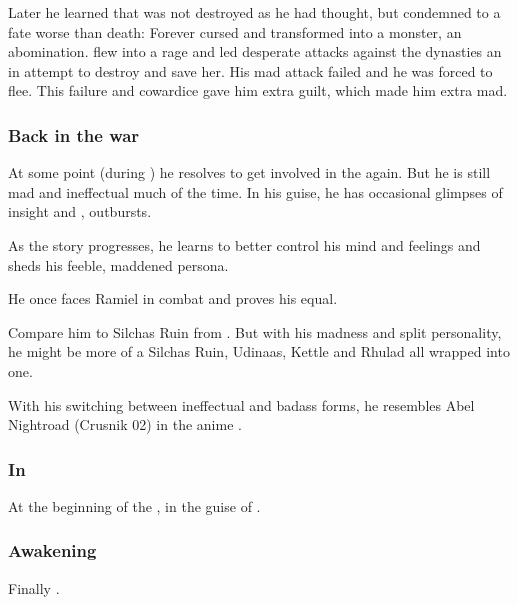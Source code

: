 Later he learned that  was not destroyed as he had thought, but condemned to a fate worse than death:
Forever cursed and transformed into a monster, an abomination. 
\Sithiyacaan flew into a rage and led desperate attacks against the dynasties an in attempt to destroy \iquin and save her. 
His mad attack failed and he was forced to flee. 
This failure and cowardice gave him extra guilt, which made him extra mad. 





\subsubsection{Back in the war}
At some point (during \SentinelsofMithEmph) he resolves to get involved in the \secretwar{} again. 
But he is still mad and ineffectual much of the time. 
In his \human{} guise, he has occasional glimpses of insight and ,  outbursts.

As the story progresses, he learns to better control his mind and feelings and sheds his feeble, maddened persona.

He once faces Ramiel in combat and proves his equal.

Compare him to Silchas Ruin from \cite{StevenEriksonIanCameronEsslemont:MalazanBookoftheFallen}. 
But with his madness and split personality, he might be more of a Silchas Ruin, Udinaas, Kettle and Rhulad all wrapped into one.

With his switching between ineffectual and badass forms, he resembles Abel Nightroad (Crusnik 02) in the anime \cite{Anime:TrinityBlood}.





\subsubsection{In \Redce}
At the beginning of the \thirdbanewar, \Sithiyacaan {} in the guise of . 





\subsubsection{Awakening}
Finally . 









